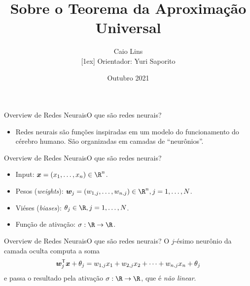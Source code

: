 \documentclass[13pt]{beamer}
\title[Teorema da Aproximação Universal]{Sobre o Teorema da Aproximação Universal}
\author[C. Lins]{Caio Lins \texorpdfstring{\\}{}[1ex]  {\small Orientador: Yuri Saporito}}
\institute[EMAp]{FGV - EMAp}
\date[EMAp 2021]{Outubro 2021}
\begin{document}
\maketitle


\begin{frame}{Overview de Redes Neurais}{O que são redes neurais?}
    \begin{itemize}
        \item Redes neurais são funções inspiradas em um modelo do funcionamento do cérebro humano.
            São organizadas em camadas de ``neurônios''.
    \end{itemize}
    \begin{figure}
        \begin{center}
            
        \end{center}
    \end{figure}
\end{frame}

\begin{frame}{Overview de Redes Neurais}{O que são redes neurais?}
    \begin{itemize}
        \item Input: \( \bfx = ( x_{ 1 }, \dots, x_{ n } ) \in \R^{ n } \).
        \item Pesos (\emph{weights}): \( \bfw_{ j } = ( w_{ 1, j }, \dots, w_{ n, j } ) \in \R^{ n }, j = 1, \dots, N \).
        \item Viéses (\emph{biases}): \( \theta_{ j } \in \R , j = 1, \dots, N\).
        \item Função de ativação: \( \sigma : \R \to \R \).
    \end{itemize}
    \begin{center}
        
    \end{center}
\end{frame}

\begin{frame}{Overview de Redes Neurais}{O que são redes neurais?}
    \vspace{2pt}
    O \( j \)-ésimo neurônio da camada oculta computa a soma
    \begin{equation*}
        \bm{w}_{ j }^{ \mathsf{T} } \bm{x} + \theta_{ j } = w_{ 1, j }x_{ 1 } + w_{ 2,j } x_{ 2 } + \cdots + w_{ n, j } x_{ n } + \theta_{ j }
    \end{equation*}
    e passa o resultado pela ativação \( \sigma : \R \to \R \), que é \emph{não linear}.
    \begin{center}
        
    \end{center}
\end{frame}
\end{document}
